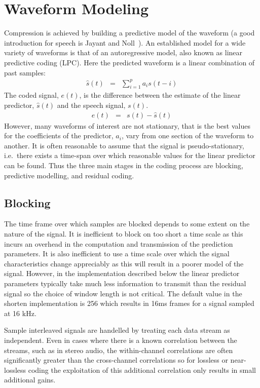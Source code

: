 \section{Waveform Modeling\label{ss:model}}

Compression is achieved by building a predictive model of the waveform
(a good introduction for speech is Jayant and Noll~\cite{JayantNoll84}).
An established model for a wide variety of waveforms is that of an
autoregressive model, also known as linear predictive coding (LPC).
Here the predicted waveform is a linear combination of past samples:
\begin{eqnarray}
\hat{s}(t) & = & \sum_{i = 1}^{p} a_i s(t - i) \label{eq:lpc}
\end{eqnarray}
The coded signal, $e(t)$, is the difference
between the estimate of the linear predictor, $\hat{s}(t)$ and the
speech signal, $s(t)$.
\begin{eqnarray}
e(t) & = & s(t) - \hat{s}(t) \label{eq:error}
\end{eqnarray}
However, many waveforms of interest are not stationary, that is the best
values for the coefficients of the predictor, $a_i$, vary from one
section of the waveform to another.  It is often reasonable to assume
that the signal is pseudo-stationary, i.e.\ there exists a time-span
over which reasonable values for the linear predictor can be found.
Thus the three main stages in the coding process are blocking,
predictive modelling, and residual coding.

\subsection{Blocking}

The time frame over which samples are blocked depends to some extent on
the nature of the signal.  It is inefficient to block on too short a
time scale as this incurs an overhead in the computation and
transmission of the prediction parameters.  It is also inefficient to
use a time scale over which the signal characteristics change
appreciably as this will result in a poorer model of the signal.
However, in the implementation described below the linear predictor
parameters typically take much less information to transmit than the
residual signal so the choice of window length is not critical.  The
default value in the shorten implementation is 256 which results in 16ms
frames for a signal sampled at 16 kHz.

Sample interleaved signals are handelled by treating each data stream as
independent.  Even in cases where there is a known correlation between
the streams, such as in stereo audio, the within-channel correlations
are often significantly greater than the cross-channel correlations so
for lossless or near-lossless coding the exploitation of this additional
correlation only results in small additional gains.


